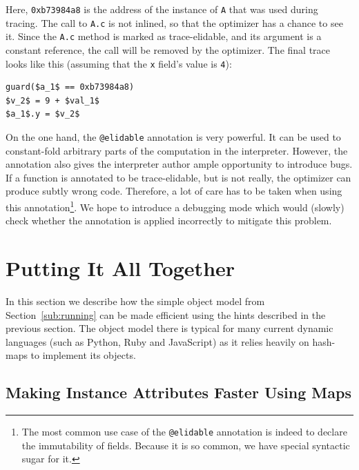 \documentclass{sigplanconf}
\newcommand{\noop}{}
\begin{document}
Here, \texttt{0xb73984a8} is the address of the instance of \texttt{A} that was used
during tracing. The call to \texttt{A.c} is not inlined, so that the optimizer
has a chance to see it. Since the \texttt{A.c} method is marked as trace-elidable, and its
argument
is a constant reference, the call will be removed by the optimizer. The final
trace looks like this (assuming that the \texttt{x} field's value is \texttt{4}):
%
{\noop
\begin{lstlisting}[mathescape,basicstyle=\ttfamily]
guard($a_1$ == 0xb73984a8)
$v_2$ = 9 + $val_1$
$a_1$.y = $v_2$
\end{lstlisting}
}

On the one hand, the \texttt{@elidable} annotation is very powerful. It can be
used to constant-fold arbitrary parts of the computation in the interpreter.
However, the annotation also gives the interpreter author ample opportunity to introduce bugs. If a
function is annotated to be trace-elidable, but is not really, the optimizer can produce
subtly wrong code. Therefore, a lot of care has to be taken when using this
annotation\footnote{The most common use case of the \texttt{@elidable}
annotation is indeed to declare the immutability of fields. Because it is so
common, we have special syntactic sugar for it.}. We hope to introduce a
debugging mode which would (slowly) check whether the annotation is applied
incorrectly to mitigate this problem.



\section{Putting It All Together}
\label{sec:fastobjmodel}

In this section we describe how the simple object model from
Section~\ref{sub:running} can be made efficient using the hints described in the
previous section. The object model there is typical for many current
dynamic languages (such as Python, Ruby and JavaScript) as it relies heavily on
hash-maps to implement its objects.


\subsection{Making Instance Attributes Faster Using Maps}
\end{document}
